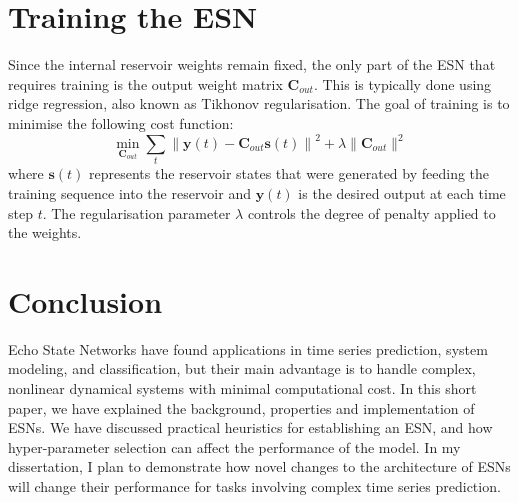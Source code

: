\documentclass[a4paper,12pt]{article}
\begin{document}

\section*{Training the ESN}

Since the internal reservoir weights remain fixed, the only part of the ESN that requires training is the output weight matrix $\mathbf{C}_{out}$. This is typically done using ridge regression, also known as Tikhonov regularisation. The goal of training is to minimise the following cost function:
\begin{equation*}
\min_{\mathbf{C}_{out}} \sum_t \left\| \mathbf{y}(t) - \mathbf{C}_{out}\mathbf{s}(t) \right\|^2 + \lambda \|\mathbf{C}_{out}\|^2
\end{equation*}
where $\mathbf{s}(t)$ represents the reservoir states that were generated by feeding the training sequence into the reservoir and $\mathbf{y}(t)$ is the desired output at each time step $t$. The regularisation parameter $\lambda$ controls the degree of penalty applied to the weights.

\section*{Conclusion}

Echo State Networks have found applications in time series prediction, system modeling, and classification, but their main advantage is to handle complex, nonlinear dynamical systems with minimal computational cost. In this short paper, we have explained the background, properties and implementation of ESNs. We have discussed practical heuristics for establishing an ESN, and how hyper-parameter selection can affect the performance of the model. In my dissertation, I plan to demonstrate how novel changes to the architecture of ESNs will change their performance for tasks involving complex time series prediction.





\end{document}

